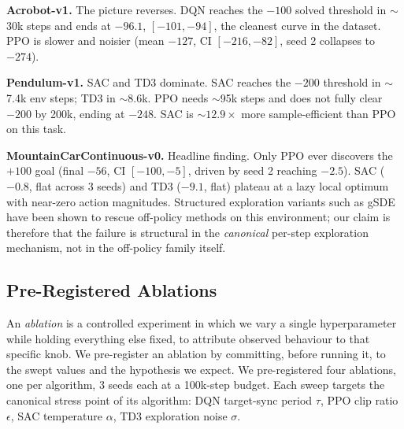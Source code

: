 \documentclass{article}
\begin{document}
\textbf{Acrobot-v1.} The picture reverses. DQN reaches the $-100$ solved threshold in $\sim$30k steps and ends at $-96.1$, $[-101, -94]$, the cleanest curve in the dataset. PPO is slower and noisier (mean $-127$, CI $[-216, -82]$, seed 2 collapses to $-274$).

\textbf{Pendulum-v1.} SAC and TD3 dominate. SAC reaches the $-200$ threshold in $\sim$7.4k env steps; TD3 in $\sim$8.6k. PPO needs $\sim$95k steps and does not fully clear $-200$ by 200k, ending at $-248$. SAC is $\sim 12.9\times$ more sample-efficient than PPO on this task.

\textbf{MountainCarContinuous-v0.} Headline finding. Only PPO ever discovers the $+100$ goal (final $-56$, CI $[-100, -5]$, driven by seed 2 reaching $-2.5$). SAC ($-0.8$, flat across 3 seeds) and TD3 ($-9.1$, flat) plateau at a lazy local optimum with near-zero action magnitudes. Structured exploration variants such as gSDE \cite{raffin2022smooth} have been shown to rescue off-policy methods on this environment; our claim is therefore that the failure is structural in the \emph{canonical} per-step exploration mechanism, not in the off-policy family itself.

\subsection{Pre-Registered Ablations}
\label{sec:ablations}

An \emph{ablation} is a controlled experiment in which we vary a single hyperparameter while holding everything else fixed, to attribute observed behaviour to that specific knob. We pre-register an ablation by committing, before running it, to the swept values and the hypothesis we expect. We pre-registered four ablations, one per algorithm, 3 seeds each at a 100k-step budget. Each sweep targets the canonical stress point of its algorithm: DQN target-sync period $\tau$, PPO clip ratio $\epsilon$, SAC temperature $\alpha$, TD3 exploration noise $\sigma$.
\end{document}
